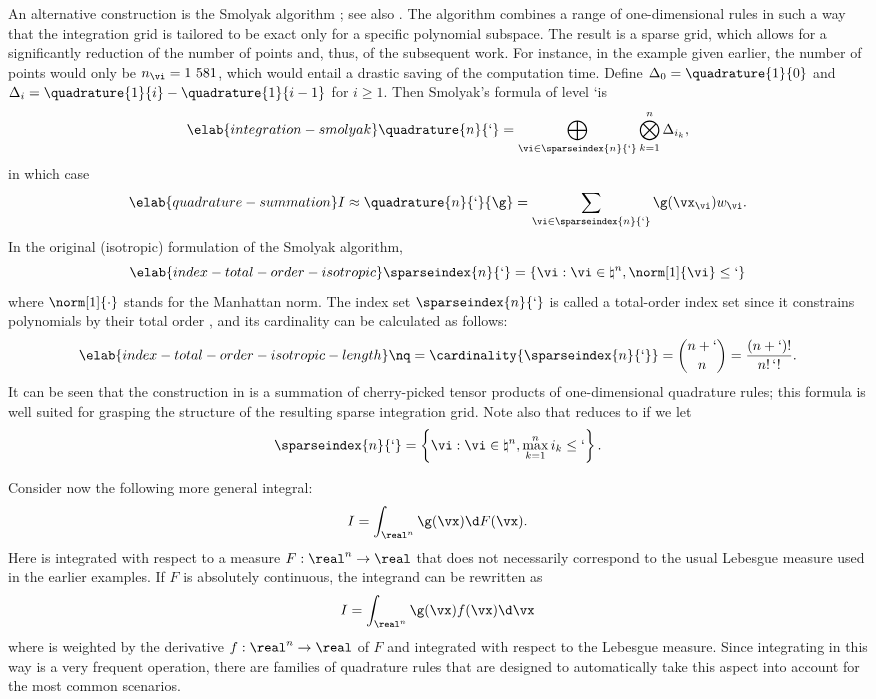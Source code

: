 An alternative construction is the Smolyak algorithm \cite{smolyak1963}; see
also \cite{eldred2008, heiss2008, maitre2010}. The algorithm combines a range of
one-dimensional rules in such a way that the integration grid is tailored to be
exact only for a specific polynomial subspace. The result is a sparse grid,
which allows for a significantly reduction of the number of points and, thus, of
the subsequent work. For instance, in the example given earlier, the number of
points would only be $n_{\vi} = 1~581$, which would entail a drastic saving of
the computation time. Define $\Delta_0 = \quadrature{1}{0}$ and $\Delta_i =
\quadrature{1}{i} - \quadrature{1}{i - 1}$ for $i \geq 1$. Then Smolyak's
formula of level \lq is
\begin{equation} \elab{integration-smolyak}
  \quadrature{n}{\lq} = \bigoplus_{\vi \in \sparseindex{n}{\lq}} \bigotimes_{k = 1}^n \Delta_{i_k},
\end{equation}
in which case
\begin{equation} \elab{quadrature-summation}
  I \approx \quadrature{n}{\lq}{\g} = \sum_{\vi \in \sparseindex{n}{\lq}} \g(\vx_{\vi}) w_{\vi}.
\end{equation}
In the original (isotropic) formulation of the Smolyak algorithm,
\begin{equation} \elab{index-total-order-isotropic}
  \sparseindex{n}{\lq} = \left\{ \vi: \vi \in \natural^n, \norm[1]{\vi} \leq \lq \right\}
\end{equation}
where $\norm[1]{\cdot}$ stands for the Manhattan norm. The index set
$\sparseindex{n}{\lq}$ is called a total-order index set since it constrains
polynomials by their total order \cite{eldred2008, beck2011}, and its
cardinality can be calculated as follows:
\begin{equation} \elab{index-total-order-isotropic-length}
  \nq = \cardinality{\sparseindex{n}{\lq}} = {n + \lq \choose n} = \frac{(n + \lq)!}{n! \, \lq!}.
\end{equation}
It can be seen that the construction in  is a
summation of cherry-picked tensor products of one-dimensional quadrature rules;
this formula is well suited for grasping the structure of the resulting sparse
integration grid. Note also that  reduces to
 if we let
\[
  \sparseindex{n}{\lq} = \left\{ \vi: \vi \in \natural^n, \max_{k = 1}^n i_k \leq \lq \right\}.
\]

Consider now the following more general integral:
\[
  I = \int_{\real^n} \g(\vx) \d F(\vx).
\]
Here \g is integrated with respect to a measure $F: \real^n \to \real$
\cite{durrett2010} that does not necessarily correspond to the usual Lebesgue
measure used in the earlier examples. If $F$ is absolutely continuous, the
integrand can be rewritten as
\[
  I = \int_{\real^n} \g(\vx) f(\vx) \d \vx
\]
where \g is weighted by the derivative $f: \real^n \to \real$ of $F$ and
integrated with respect to the Lebesgue measure. Since integrating in this way
is a very frequent operation, there are families of quadrature rules that are
designed to automatically take this aspect into account for the most common
scenarios.

